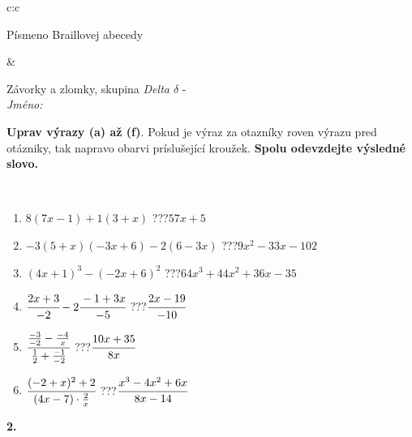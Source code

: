 \documentclass[10pt]{report}
\begin{document}
\begin{tabular}{c:c}
\begin{minipage}[c][104.5mm][t]{0.5\linewidth}
\begin{center}
\begin{minipage}{0.20\linewidth}
\begin{center}
{\small Písmeno Braillovej abecedy}
\end{center}
\end{minipage}
\end{center}
\end{minipage}
&
\begin{minipage}[c][104.5mm][t]{0.5\linewidth}
\begin{center}
\vspace{7mm}
{\huge Závorky a zlomky, skupina \textit{Delta $\delta$} -}\\[5mm]
\textit{Jméno:}\phantom{xxxxxxxxxxxxxxxxxxxxxxxxxxxxxxxxxxxxxxxxxxxxxxxxxxxxxxxxxxxxxxxxx}\\[5mm]
\begin{minipage}{0.95\linewidth}
\begin{center}
\textbf{Uprav výrazy (a) až (f)}. Pokud je výraz za otazníky roven výrazu pred otázniky, tak napravo obarvi príslušející kroužek. \textbf{Spolu odevzdejte výsledné slovo.}
\end{center}
\end{minipage}
\\[1mm]
\begin{minipage}{0.79\linewidth}
\begin{center}
\begin{varwidth}{\linewidth}
\begin{enumerate}
\normalsize
\item $8(7x-1)+1(3+x)$\quad \dotfill\; ???\;\dotfill \quad $57x+5$
\item $-3(5+x)(-3x+6)-2(6-3x)$\quad \dotfill\; ???\;\dotfill \quad $9x^2-33x-102$
\item $(4x+1)^3-(-2x+6)^2$\quad \dotfill\; ???\;\dotfill \quad $64x^3+44x^2+36x-35$
\item $\cfrac{2x+3}{-2}-2\cfrac{-1+3x}{-5}$\quad \dotfill\; ???\;\dotfill \quad $\cfrac{2x-19}{-10}$
\item $\cfrac{\frac{-3}{-2}-\frac{-4}{x}}{\frac{1}{2}+\frac{-1}{-2}}$\quad \dotfill\; ???\;\dotfill \quad $\cfrac{10x+35}{8x}$
\item $\cfrac{(-2+x)^2+2}{(4x-7)\cdot\frac{2}{x}}$\quad \dotfill\; ???\;\dotfill \quad $\cfrac{x^3-4x^2+6x}{8x-14}$
\end{enumerate}
\end{varwidth}
\end{center}
\end{minipage}
\begin{minipage}{0.20\linewidth}
\begin{center}
{\Huge\bfseries 2.} \\[2mm]

\end{center}
\end{minipage}
\end{center}
\end{minipage}
\end{tabular}
\end{document}
